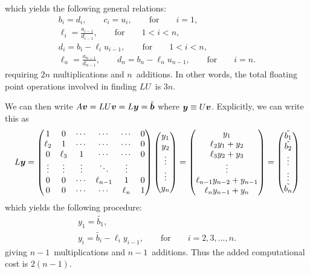 \documentclass[english,notitlepage]{revtex4-1}  %
\begin{document}
which yields the following general relations: 
\begin{gather}
	b_i = d_i, \qquad c_i = u_i, \qquad \text{for} \qquad i = 1,\\
	\ell_i = \frac{a_{i-1}}{d_{i-1}}, \qquad \text{for} \qquad 1 < i < n, \\
	d_i = b_i - \ell_iu_{i-1}, \qquad \text{for} \qquad 1 < i < n, \\
	\ell_n = \frac{a_{n-1}}{d_{n-1}}, \qquad d_n = b_n - \ell_n u_{n-1}, \qquad \text{for} \qquad i = n.
\end{gather}
requiring $2n$ multiplications and $n$ additions. In other words, the total floating point operations involved in finding $LU$ is $3n$.

We can then write $A\vb*{v} = LU\vb*{v} = L\vb*{y} =  \tilde{\vb*{b}}$ where $\vb*{y} \equiv U\vb*{v}$. Explicitly, we can write this as 
\begin{equation}
	L\vb*{y} = 	\begin{pmatrix}
	1 & 0 & \cdots &  \cdots & \cdots & 0 \\
	\ell_2 & 1 & \cdots & \cdots & \cdots & 0 \\
	0 & \ell_3 & 1 & \cdots & \cdots & 0 \\
	\vdots & \vdots & \vdots & \ddots & \vdots \\
	0 & 0 & \cdots & \ell_{n-1} & 1 & 0 \\
	0 & 0 & \cdots &\cdots & \ell_n & 1  
	\end{pmatrix}
	\begin{pmatrix}
	y_1 \\ y_2 \\ \vdots \\ \vdots \\ y_n 
	\end{pmatrix}
	=
	\begin{pmatrix}
	y_1 \\
	\ell_2y_1 + y_2 \\
	\ell_3y_2 + y_3 \\
	\vdots \\
	\ell_{n-1}y_{n-2} + y_{n-1} \\ 
	\ell_ny_{n-1} + y_{n}
	\end{pmatrix}
	=
	\begin{pmatrix}
	\tilde{b_1} \\ \tilde{b_2} \\ \vdots \\ \vdots \\ \tilde{b_n}
	\end{pmatrix}
\end{equation}
which yields the following procedure:
\begin{gather}
	y_1 = \tilde{b_1}, \\
	y_i = \tilde{b_i} - \ell_iy_{i-1}, \qquad \text{for} \qquad i =2,3,...,n.
\end{gather}
giving $n-1$ multiplications and $n-1$ additions. Thus the added computational cost is $2(n-1)$. 
\end{document}
